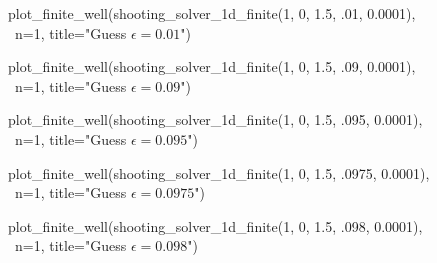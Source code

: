 \documentclass{article}
\begin{document}
\begin{figure}[H]
\begin{sageblock}
plot_finite_well(shooting_solver_1d_finite(1, 0, 1.5, .01, 0.0001), \
                 n=1, title="Guess $\epsilon=0.01$")
\end{sageblock}
\vspace{-.1in}
\centering
{}
\end{figure}
\vspace{-.2in}
\begin{figure}[H]
\begin{sageblock}
plot_finite_well(shooting_solver_1d_finite(1, 0, 1.5, .09, 0.0001), \
                 n=1, title="Guess $\epsilon=0.09$")
\end{sageblock}
\vspace{-.1in}
\centering
{}
\end{figure}
\vspace{-.2in}
\begin{figure}[H]
\begin{sageblock}
plot_finite_well(shooting_solver_1d_finite(1, 0, 1.5, .095, 0.0001), \
                 n=1, title="Guess $\epsilon=0.095$")
\end{sageblock}
\vspace{-.1in}
\centering
{}
\end{figure}
\vspace{-.2in}
\begin{figure}[H]
\begin{sageblock}
plot_finite_well(shooting_solver_1d_finite(1, 0, 1.5, .0975, 0.0001), \
                 n=1, title="Guess $\epsilon=0.0975$")
\end{sageblock}
\vspace{-.1in}
\centering
{}
\end{figure}
\vspace{-.2in}
\begin{figure}[H]
\begin{sageblock}
plot_finite_well(shooting_solver_1d_finite(1, 0, 1.5, .098, 0.0001), \
                 n=1, title="Guess $\epsilon=0.098$")
\end{sageblock}
\vspace{-.1in}
\centering
{}
\end{figure}
\end{document}
